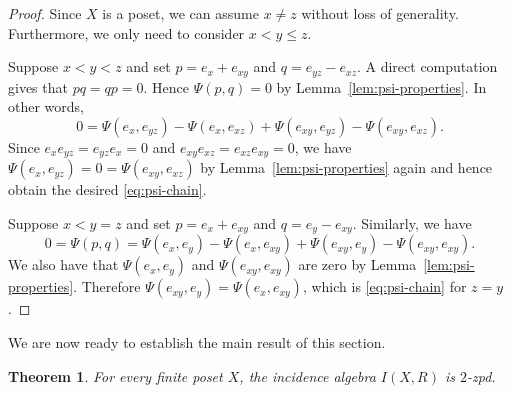 \documentclass[reqno]{amsart}
\numberwithin{equation}{section}
\theoremstyle{plain}
\newtheorem{theorem}{Theorem}[section]
\theoremstyle{definition}
\begin{document}
\begin{proof}
Since $X$ is a poset, we can assume $x\neq z$ without loss of generality.
Furthermore, we only need to consider $x<y\leq z$.

Suppose $x<y<z$ and set
$p=e_x+e_{xy}$ and $q=e_{yz}-e_{xz}$. A direct computation gives that $pq=qp=0$.
Hence $\Psi(p,q)=0$ by Lemma~\ref{lem:psi-properties}. In other words,
\[
0=\Psi(e_x,e_{yz})-\Psi(e_x,e_{xz})
+\Psi(e_{xy},e_{yz})-\Psi(e_{xy},e_{xz}).
\]
Since $e_x e_{yz}=e_{yz}e_x=0$ and $e_{xy}e_{xz}=e_{xz}e_{xy}=0$, we have
$\Psi(e_x,e_{yz})=0=\Psi(e_{xy},e_{xz})$ by Lemma~\ref{lem:psi-properties} again and hence
obtain the desired \eqref{eq:psi-chain}.

Suppose $x<y=z$ and set $p=e_x+e_{xy}$ and $q=e_y-e_{xy}$. Similarly, we have
\[
0=\Psi(p,q)=\Psi(e_x,e_y)-\Psi(e_x,e_{xy})
+\Psi(e_{xy},e_y)-\Psi(e_{xy},e_{xy}).
\]
We also have that $\Psi(e_x,e_y)$ and $\Psi(e_{xy},e_{xy})$ are zero by Lemma~\ref{lem:psi-properties}.
Therefore $\Psi(e_{xy},e_y)=\Psi(e_x,e_{xy})$, which is
\eqref{eq:psi-chain} for $z=y$.
\end{proof}

We are now ready to establish the main result of this section.

\begin{theorem}\label{thm:incidence-2zpd}
For every finite poset $X$, the incidence algebra $I(X,R)$ is $2$-zpd.
\end{theorem}
\end{document}
